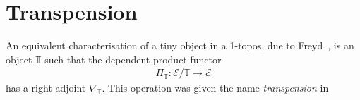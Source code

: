 \documentclass[10pt]{article}
\makeatletter
\theoremstyle{definition}
\let\oldequiv\equiv%
\renewcommand{\equiv}{\simeq}
\newcommand{\defeq}{\oldequiv}
\newcommand*{\univ}{\mathcal{U}}
\newcommand*{\code}{\mathsf{code}}
\newcommand*{\encode}{\mathsf{encode}}
\newcommand*{\decode}{\mathsf{decode}}
\def\prdsym{\prod}
\newcommand{\@theprd}[1]{\prdsym_{(#1)}}
\newcommand{\prd}[1]{\@ifnextchar\bgroup{\@prd{#1}\prd}{\@prd{#1}}}
\newcommand{\@prd}[1]{\mathchoice{{\textstyle\@theprd{#1}}}{\@theprd{#1}}{\@theprd{#1}}{\@theprd{#1}}}
\newcommand{\lock}{\mathchoice {\scalebox{0.8}{\text{\faLock}}}
  {\scalebox{0.8}{\text{\faLock}}} {\scalebox{0.5}{\text{\faLock}}}
  {\scalebox{0.4}{\text{\faLock}}} }
\newcommand{\key}{\mathchoice
  {\scalebox{0.8}{\text{\faKey}}} {\scalebox{0.8}{\text{\faKey}}}
  {\scalebox{0.5}{\text{\faKey}}} {\scalebox{0.4}{\text{\faKey}}} }
\newcommand{\rbindsym}{\raisebox{-0.5pt}{\scalerel*{\reflectbox{\rotatebox[origin=c]{185}{$\lambda$}}}{\lambda}}}
\newcommand{\Tiny}{\mathbb{T}}
\newcommand{\lockn}[1]{\mathcal{#1}}
\newcommand{\varkeye}[2]{\key_{#1}^{#2}}
\newcommand{\varkey}[2]{\varkeye{\lockn{#1}}{#2}}
\newcommand{\admkeye}[2]{\overrightarrow{\key}_{#1}^{#2}}
\newcommand{\admkey}[2]{\admkeye{\lockn{#1}}{#2}}
\newcommand{\rforme}[2]{\ThisStyle{\raisebox{0.07em}{$\SavedStyle \surd_{\hspace{-0.25em}#1}$}} #2}
\newcommand{\rform}[2]{\rforme{\lockn{#1}}{#2}}
\newcommand{\rformu}[1]{\ThisStyle{\raisebox{0.07em}{$\SavedStyle \surd$}} #1}
\newcommand{\rintroe}[2]{\lock_{#1}. #2}
\newcommand{\rintro}[2]{\rintroe{\lockn{#1}}{#2}}
\newcommand{\relim}[1]{\rbindsym #1}
\newcommand{\rget}[1]{{#1}_{\downharpoonleft}}
\makeatother
\begin{document}

\section{Transpension}\label{sec:transpension}

An equivalent characterisation of a tiny object in a 1-topos, due to
Freyd~\cite[Proposition 1.2]{yetter:tiny}, is an object $\Tiny$ such
that the dependent product functor
\begin{align*}
  \Pi_\Tiny : \mathcal{E}/\Tiny \to \mathcal{E}
\end{align*}
has a right adjoint $\nabla_\Tiny$. This operation was given the name \emph{transpension} in~\cite{dependable-atomicity, transpension}
\end{document}

